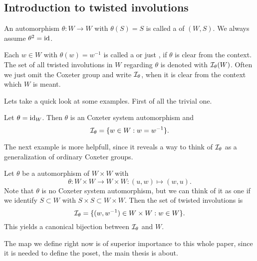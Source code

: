 \subsection{Introduction to twisted involutions}
\label{sec:twisted-involutions-introduction}

\begin{defi}
	An automorphism $\theta : W \to W$ with $\theta(S) = S$ is called a  of $(W,S)$. We always assume $\theta^2 = \operatorname{id}$.
\end{defi}

\begin{defi}
	Each $w \in W$ with $\theta(w) = w^{-1}$ is called a  or just , if $\theta$ is clear from the context. The set of all twisted involutions in $W$ regarding $\theta$ is denoted with $\mathcal{I}_{\theta}(W)$. Often we just omit the Coxeter group and write $\mathcal{I}_{\theta}$, when it is clear from the context which $W$ is meant.
\end{defi}

Lets take a quick look at some examples. First of all the trivial one.

\begin{exam}
	Let $\theta = \operatorname{id}_W$. Then $\theta$ is an Coxeter system automorphism and
	$$ \mathcal{I}_{\theta} = \{ w \in W : w = w^{-1} \}. $$
\end{exam}

The next example is more helpfull, since it reveals a way to think of $\mathcal{I}_{\theta}$ as a generalization of ordinary Coxeter groups.

\begin{exam}
	Let $\theta$ be a automorphism of $W \times W$ with
	$$ \theta : W \times W \to W \times W : (u,w) \mapsto (w,u). $$
	Note that $\theta$ is no Coxeter system automorphism, but we can think of it as one if we identify $S \subset W$ with $S \times S \subset W \times W$.
	Then the set of twisted involutions is
	$$ \mathcal{I}_{\theta} = \{ (w,w^{-1}) \in W \times W : w \in W \}. $$
	This yields a canonical bijection between $\mathcal{I}_{\theta}$ and $W$.
\end{exam}

The map we define right now is of superior importance to this whole paper, since it is needed to define the poset, the main thesis is about.

